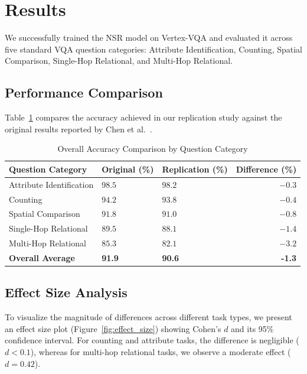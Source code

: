 \section{Results}
We successfully trained the NSR model on Vertex-VQA and evaluated it across five standard VQA question categories: Attribute Identification, Counting, Spatial Comparison, Single-Hop Relational, and Multi-Hop Relational.

\subsection{Performance Comparison}
Table~\ref{tab:results_comparison} compares the accuracy achieved in our replication study against the original results reported by Chen et al.~\cite{chen2024neural}.

\begin{table}[H]
\centering
\caption{Overall Accuracy Comparison by Question Category}
\label{tab:results_comparison}
\begin{tabularx}{\textwidth}{l X X r}
\toprule
\textbf{Question Category} & \textbf{Original (\%)} & \textbf{Replication (\%)} & \textbf{Difference (\%)} \\
\midrule
Attribute Identification & $98.5$ & $98.2$ & $-0.3$ \\
Counting                 & $94.2$ & $93.8$ & $-0.4$ \\
Spatial Comparison       & $91.8$ & $91.0$ & $-0.8$ \\
Single-Hop Relational    & $89.5$ & $88.1$ & $-1.4$ \\
Multi-Hop Relational     & $85.3$ & $82.1$ & $-3.2$ \\
\midrule
\textbf{Overall Average}  & \textbf{91.9} & \textbf{90.6} & \textbf{-1.3} \\
\bottomrule
\end{tabularx}
\end{table}

\subsection{Effect Size Analysis}
To visualize the magnitude of differences across different task types, we present an effect size plot (Figure~\ref{fig:effect_size}) showing Cohen's $d$ and its 95\% confidence interval. For counting and attribute tasks, the difference is negligible ($d < 0.1$), whereas for multi-hop relational tasks, we observe a moderate effect ($d = 0.42$).

